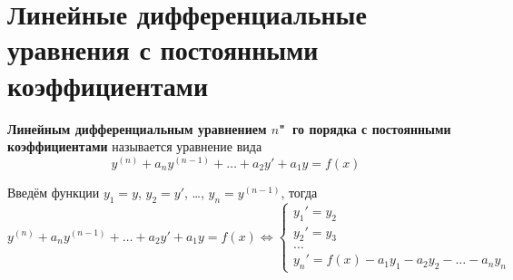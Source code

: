 \section{Линейные дифференциальные уравнения с постоянными коэффициентами}
 \textbf{Линейным дифференциальным уравнением $n$"~го порядка с постоянными коэффициентами} называется уравнение вида
\begin{equation}
\label{eq:linear_differential_equation}
y^{(n)} + a_n y^{(n-1)} + \ldots + a_2 y' + a_1 y = f(x)
\end{equation}

Введём функции $y_1 = y$, $y_2 = y'$, \ldots, $y_n = y^{(n-1)}$, тогда
\begin{equation*}
y^{(n)} + a_n y^{(n-1)} + \ldots + a_2 y' + a_1 y = f(x) \Leftrightarrow
\begin{cases}
y_1' = y_2 \\
y_2' = y_3 \\
\ldots \\
y_n' = f(x) - a_1 y_1 - a_2 y_2 - \ldots - a_n y_n
\end{cases}
\end{equation*}

